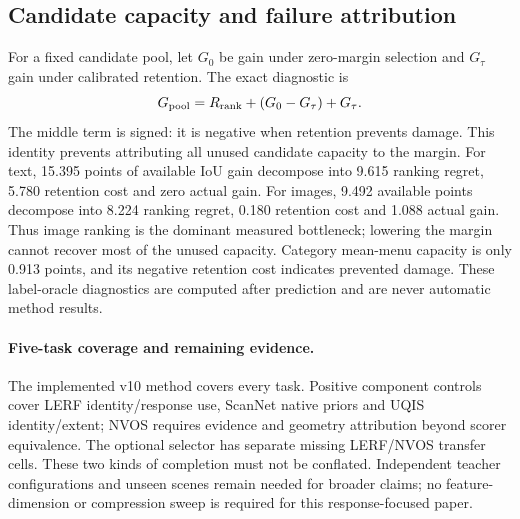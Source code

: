 \subsection{Candidate capacity and failure attribution}
For a fixed candidate pool, let $G_0$ be gain under zero-margin selection and
$G_\tau$ gain under calibrated retention. The exact diagnostic is
\[
G_{\rm pool}=R_{\rm rank}+(G_0-G_\tau)+G_\tau.
\]
The middle term is signed: it is negative when retention prevents damage.
This identity prevents attributing all unused candidate capacity to the margin.
For text, 15.395 points of available IoU gain decompose into 9.615 ranking regret,
5.780 retention cost and zero actual gain. For images, 9.492 available points
decompose into 8.224 ranking regret, 0.180 retention cost and 1.088 actual gain.
Thus image ranking is the dominant measured bottleneck; lowering the margin
cannot recover most of the unused capacity. Category mean-menu capacity is
only 0.913 points, and its negative retention cost indicates prevented damage.
These label-oracle diagnostics are computed after prediction and are never
automatic method results.

\paragraph{Five-task coverage and remaining evidence.}
The implemented v10 method covers every task. Positive component controls cover
LERF identity/response use, ScanNet native priors and UQIS identity/extent;
NVOS requires evidence and geometry attribution beyond scorer equivalence.
The optional selector has separate missing LERF/NVOS transfer cells. These two
kinds of completion must not be conflated. Independent teacher configurations
and unseen scenes remain needed for broader claims; no feature-dimension or
compression sweep is required for this response-focused paper.
